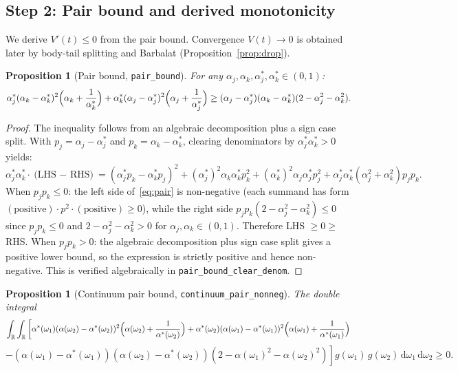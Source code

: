 \documentclass[11pt,a4paper]{article}
\newtheorem{proposition}[theorem]{Proposition}
\theoremstyle{definition}
\newcommand{\R}{\mathbb{R}}
\begin{document}
\subsection{Step 2: Pair bound and derived monotonicity}\label{sec:pair}

We derive $V'(t) \leq 0$ from the pair bound. Convergence $V(t) \to 0$ is obtained later by body-tail splitting and Barbalat (Proposition~\ref{prop:drop}).

\begin{proposition}[Pair bound, \texttt{pair\_bound}]\label{prop:pair}
For any $\alpha_j, \alpha_k, \alpha^*_j, \alpha^*_k \in (0,1)$:
\begin{equation}\label{eq:pair}
\alpha^*_j(\alpha_k - \alpha^*_k)^2\Bigl(\alpha_k + \frac{1}{\alpha^*_k}\Bigr) + \alpha^*_k(\alpha_j - \alpha^*_j)^2\Bigl(\alpha_j + \frac{1}{\alpha^*_j}\Bigr) \geq (\alpha_j - \alpha^*_j)(\alpha_k - \alpha^*_k)(2 - \alpha_j^2 - \alpha_k^2).
\end{equation}
\end{proposition}

\begin{proof}
The inequality follows from an algebraic decomposition plus a sign case split. With $p_j = \alpha_j - \alpha^*_j$ and $p_k = \alpha_k - \alpha^*_k$, clearing denominators by $\alpha^*_j \alpha^*_k > 0$ yields:
\[
\alpha^*_j \alpha^*_k \cdot \text{(LHS $-$ RHS)} = (\alpha^*_j p_k - \alpha^*_k p_j)^2 + (\alpha^*_j)^2 \alpha_k \alpha^*_k p_k^2 + (\alpha^*_k)^2 \alpha_j \alpha^*_j p_j^2 + \alpha^*_j \alpha^*_k (\alpha_j^2 + \alpha_k^2) p_j p_k.
\]
When $p_j p_k \leq 0$: the left side of~\eqref{eq:pair} is non-negative (each summand has form $(\text{positive}) \cdot p^2 \cdot (\text{positive}) \geq 0$), while the right side $p_j p_k(2 - \alpha_j^2 - \alpha_k^2) \leq 0$ since $p_j p_k \leq 0$ and $2 - \alpha_j^2 - \alpha_k^2 > 0$ for $\alpha_j, \alpha_k \in (0,1)$. Therefore LHS $\geq 0 \geq$ RHS. When $p_j p_k > 0$: the algebraic decomposition plus sign case split gives a positive lower bound, so the expression is strictly positive and hence non-negative. This is verified algebraically in \texttt{pair\_bound\_clear\_denom}.
\end{proof}

\begin{proposition}[Continuum pair bound, \texttt{continuum\_pair\_nonneg}]\label{prop:cpair}
The double integral
\[
\int_\R \int_\R \left[\alpha^*(\omega_1)(\alpha(\omega_2) - \alpha^*(\omega_2))^2\Bigl(\alpha(\omega_2) + \frac{1}{\alpha^*(\omega_2)}\Bigr) + \alpha^*(\omega_2)(\alpha(\omega_1) - \alpha^*(\omega_1))^2\Bigl(\alpha(\omega_1) + \frac{1}{\alpha^*(\omega_1)}\Bigr)\right.
\]
\[
\left. - (\alpha(\omega_1) - \alpha^*(\omega_1))(\alpha(\omega_2) - \alpha^*(\omega_2))(2 - \alpha(\omega_1)^2 - \alpha(\omega_2)^2)\right] g(\omega_1)\,g(\omega_2)\,\mathrm{d}\omega_1\,\mathrm{d}\omega_2 \geq 0.
\]
\end{proposition}
\end{document}
